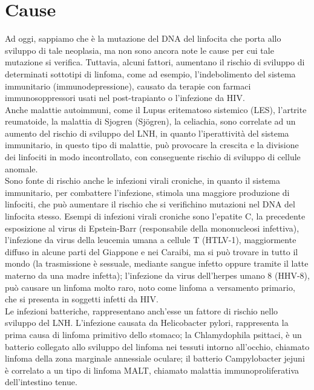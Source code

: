 \section{Cause}
Ad oggi, sappiamo che è la mutazione del DNA del linfocita che porta allo sviluppo di tale neoplasia, 
ma non sono ancora note le cause per cui tale mutazione si verifica. 
Tuttavia, alcuni fattori, aumentano il rischio di sviluppo di determinati sottotipi di linfoma, come ad esempio, 
l’indebolimento del sistema immunitario (immunodepressione), causato da terapie con farmaci 
immunosoppressori usati nel post-trapianto o l'infezione da HIV.\\ 
Anche malattie autoimmuni, come il Lupus eritematoso sistemico (LES), l'artrite reumatoide, 
la malattia di Sjogren (Sjögren), la celiachia, sono correlate ad un aumento del rischio di sviluppo del LNH, 
in quanto l’iperattività del sistema immunitario, in questo tipo di malattie, può provocare la crescita e la 
divisione dei linfociti in modo incontrollato, 
con conseguente rischio di sviluppo di cellule anomale\cite{AMERICANCS}.\\
Sono fonte di rischio anche le infezioni virali croniche, in quanto il sistema immunitario, 
per combattere l’infezione, stimola una maggiore produzione di linfociti, che può aumentare il rischio che si 
verifichino mutazioni nel DNA del linfocita stesso. Esempi di infezioni virali croniche sono l’epatite C, 
la precedente esposizione al virus di Epstein-Barr (responsabile della mononucleosi infettiva), 
l'infezione da virus della leucemia umana a cellule T (HTLV-1), maggiormente diffuso in alcune parti del 
Giappone e nei Caraibi, ma si può trovare in tutto il mondo (la trasmissione è sessuale, mediante sangue infetto 
oppure tramite il latte materno da una madre infetta); l’infezione da virus dell'herpes umano 8 (HHV-8), 
può causare un linfoma molto raro, noto come linfoma a versamento primario, che si presenta in soggetti infetti da HIV.\\
Le infezioni batteriche, rappresentano anch’esse un fattore di rischio nello sviluppo del LNH. 
L’infezione causata da Helicobacter pylori, rappresenta la prima causa di linfoma primitivo dello stomaco; 
la Chlamydophila psittaci, è un batterio collegato allo sviluppo del linfoma nei tessuti intorno all’occhio, 
chiamato linfoma della zona marginale annessiale oculare; il batterio Campylobacter jejuni è correlato a un tipo 
di linfoma MALT, chiamato malattia immunoproliferativa dell'intestino tenue\cite{AMERICANCS}.\\

